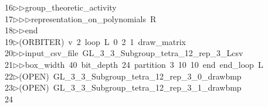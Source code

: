 \begin{tabbing}
16\>$\triangleright$\>$\triangleright$\>group\_theoretic\_activity\ \\[0pt]
17\>$\triangleright$\>$\triangleright$\>$\triangleright$\>representation\_on\_polynomials\ R\ \\[0pt]
18\>$\triangleright$\>$\triangleright$\>end\ \\[0pt]
19\>$\triangleright$\>(ORBITER)\ v\ 2\ loop\ L\ 0\ 2\ 1\ draw\_matrix\ \\[0pt]
20\>$\triangleright$\>$\triangleright$\>input\_csv\_file\ GL\_3\_3\_Subgroup\_tetra\_12\_rep\_3\_Lcsv\ \\[0pt]
21\>$\triangleright$\>$\triangleright$\>box\_width\ 40\ bit\_depth\ 24\ partition\ 3\ 10\ 10\ end\ end\_loop\ L\\[0pt]
22\>$\triangleright$\>(OPEN)\ GL\_3\_3\_Subgroup\_tetra\_12\_rep\_3\_0\_drawbmp\\[0pt]
23\>$\triangleright$\>(OPEN)\ GL\_3\_3\_Subgroup\_tetra\_12\_rep\_3\_1\_drawbmp\\[0pt]
24\>\end{tabbing}
